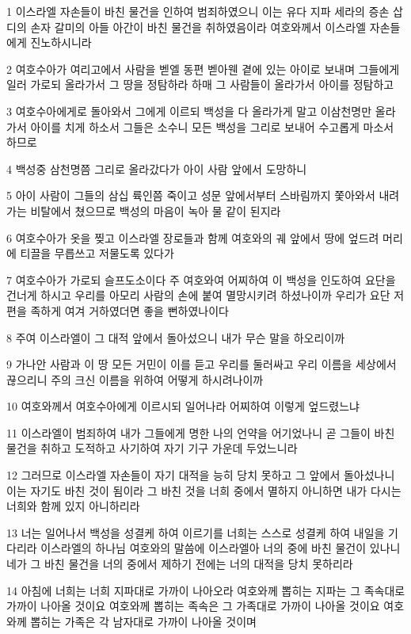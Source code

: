 \par 1 이스라엘 자손들이 바친 물건을 인하여 범죄하였으니 이는 유다 지파 세라의 증손 삽디의 손자 갈미의 아들 아간이 바친 물건을 취하였음이라 여호와께서 이스라엘 자손들에게 진노하시니라
\par 2 여호수아가 여리고에서 사람을 벧엘 동편 벧아웬 곁에 있는 아이로 보내며 그들에게 일러 가로되 올라가서 그 땅을 정탐하라 하매 그 사람들이 올라가서 아이를 정탐하고
\par 3 여호수아에게로 돌아와서 그에게 이르되 백성을 다 올라가게 말고 이삼천명만 올라가서 아이를 치게 하소서 그들은 소수니 모든 백성을 그리로 보내어 수고롭게 마소서 하므로
\par 4 백성중 삼천명쯤 그리로 올라갔다가 아이 사람 앞에서 도망하니
\par 5 아이 사람이 그들의 삼십 륙인쯤 죽이고 성문 앞에서부터 스바림까지 쫓아와서 내려가는 비탈에서 쳤으므로 백성의 마음이 녹아 물 같이 된지라
\par 6 여호수아가 옷을 찢고 이스라엘 장로들과 함께 여호와의 궤 앞에서 땅에 엎드려 머리에 티끌을 무릅쓰고 저물도록 있다가
\par 7 여호수아가 가로되 슬프도소이다 주 여호와여 어찌하여 이 백성을 인도하여 요단을 건너게 하시고 우리를 아모리 사람의 손에 붙여 멸망시키려 하셨나이까 우리가 요단 저 편을 족하게 여겨 거하였더면 좋을 뻔하였나이다
\par 8 주여 이스라엘이 그 대적 앞에서 돌아섰으니 내가 무슨 말을 하오리이까
\par 9 가나안 사람과 이 땅 모든 거민이 이를 듣고 우리를 둘러싸고 우리 이름을 세상에서 끊으리니 주의 크신 이름을 위하여 어떻게 하시려나이까
\par 10 여호와께서 여호수아에게 이르시되 일어나라 어찌하여 이렇게 엎드렸느냐
\par 11 이스라엘이 범죄하여 내가 그들에게 명한 나의 언약을 어기었나니 곧 그들이 바친 물건을 취하고 도적하고 사기하여 자기 기구 가운데 두었느니라
\par 12 그러므로 이스라엘 자손들이 자기 대적을 능히 당치 못하고 그 앞에서 돌아섰나니 이는 자기도 바친 것이 됨이라 그 바친 것을 너희 중에서 멸하지 아니하면 내가 다시는 너희와 함께 있지 아니하리라
\par 13 너는 일어나서 백성을 성결케 하여 이르기를 너희는 스스로 성결케 하여 내일을 기다리라 이스라엘의 하나님 여호와의 말씀에 이스라엘아 너의 중에 바친 물건이 있나니 네가 그 바친 물건을 너의 중에서 제하기 전에는 너의 대적을 당치 못하리라
\par 14 아침에 너희는 너희 지파대로 가까이 나아오라 여호와께 뽑히는 지파는 그 족속대로 가까이 나아올 것이요 여호와께 뽑히는 족속은 그 가족대로 가까이 나아올 것이요 여호와께 뽑히는 가족은 각 남자대로 가까이 나아올 것이며
